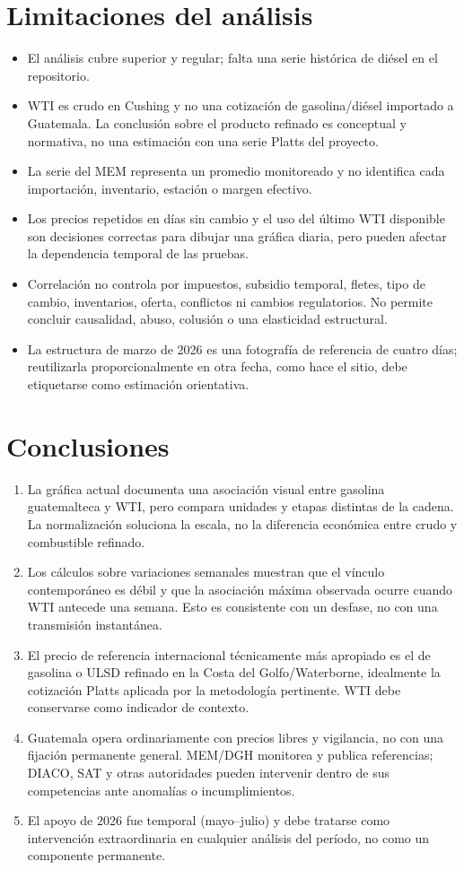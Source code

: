 \documentclass[11pt,letterpaper]{article}
\begin{document}
\section{Limitaciones del análisis}
\begin{itemize}
  \item El análisis cubre superior y regular; falta una serie histórica de diésel en el repositorio.
  \item WTI es crudo en Cushing y no una cotización de gasolina/diésel importado a Guatemala. La conclusión sobre el producto refinado es conceptual y normativa, no una estimación con una serie Platts del proyecto.
  \item La serie del MEM representa un promedio monitoreado y no identifica cada importación, inventario, estación o margen efectivo.
  \item Los precios repetidos en días sin cambio y el uso del último WTI disponible son decisiones correctas para dibujar una gráfica diaria, pero pueden afectar la dependencia temporal de las pruebas.
  \item Correlación no controla por impuestos, subsidio temporal, fletes, tipo de cambio, inventarios, oferta, conflictos ni cambios regulatorios. No permite concluir causalidad, abuso, colusión o una elasticidad estructural.
  \item La estructura de marzo de 2026 es una fotografía de referencia de cuatro días; reutilizarla proporcionalmente en otra fecha, como hace el sitio, debe etiquetarse como estimación orientativa.
\end{itemize}

\section{Conclusiones}
\begin{enumerate}
  \item La gráfica actual documenta una asociación visual entre gasolina guatemalteca y WTI, pero compara unidades y etapas distintas de la cadena. La normalización soluciona la escala, no la diferencia económica entre crudo y combustible refinado.
  \item Los cálculos sobre variaciones semanales muestran que el vínculo contemporáneo es débil y que la asociación máxima observada ocurre cuando WTI antecede una semana. Esto es consistente con un desfase, no con una transmisión instantánea.
  \item El precio de referencia internacional técnicamente más apropiado es el de gasolina o ULSD refinado en la Costa del Golfo/Waterborne, idealmente la cotización Platts aplicada por la metodología pertinente. WTI debe conservarse como indicador de contexto.
  \item Guatemala opera ordinariamente con precios libres y vigilancia, no con una fijación permanente general. MEM/DGH monitorea y publica referencias; DIACO, SAT y otras autoridades pueden intervenir dentro de sus competencias ante anomalías o incumplimientos.
  \item El apoyo de 2026 fue temporal (mayo--julio) y debe tratarse como intervención extraordinaria en cualquier análisis del período, no como un componente permanente.
\end{enumerate}
\end{document}
